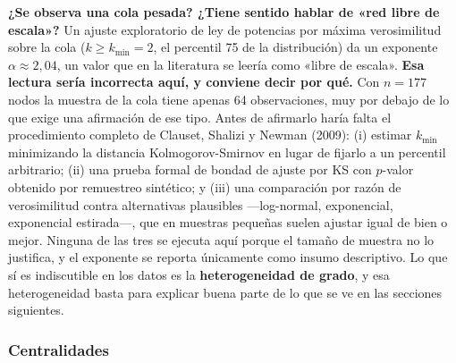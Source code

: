 \documentclass[10pt,a4paper]{extarticle}
\begin{document}
\textbf{¿Se observa una cola pesada? ¿Tiene sentido hablar de «red libre de escala»?} Un
ajuste exploratorio de ley de potencias por máxima verosimilitud sobre la cola
($k \ge k_{\min} = 2$, el percentil 75 de la distribución) da un exponente
$\alpha \approx 2{,}04$, un valor que en la literatura se leería como «libre de escala».
\textbf{Esa lectura sería incorrecta aquí, y conviene decir por qué.} Con $n = 177$ nodos
la muestra de la cola tiene apenas 64 observaciones, muy por debajo de lo que exige una
afirmación de ese tipo. Antes de afirmarlo haría falta el procedimiento completo de
Clauset, Shalizi y Newman (2009): (i) estimar $k_{\min}$ minimizando la distancia
Kolmogorov-Smirnov en lugar de fijarlo a un percentil arbitrario; (ii) una prueba formal de
bondad de ajuste por KS con $p$-valor obtenido por remuestreo sintético; y (iii) una
comparación por razón de verosimilitud contra alternativas plausibles ---log-normal,
exponencial, exponencial estirada---, que en muestras pequeñas suelen ajustar igual de
bien o mejor. Ninguna de las tres se ejecuta aquí porque el tamaño de muestra no lo
justifica, y el exponente se reporta únicamente como insumo descriptivo. Lo que sí es
indiscutible en los datos es la \textbf{heterogeneidad de grado}, y esa heterogeneidad
basta para explicar buena parte de lo que se ve en las secciones siguientes.

\subsubsection{Centralidades}
\end{document}
